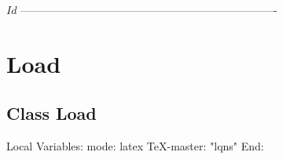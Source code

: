 \C 
\C $Id$
\C 
\C
\C ----------------------------------------------------------------------
\section{Load}
\label{sec:load}

\subsection{Class Load}
\C Local Variables: 
\C mode: latex
\C TeX-master: "lqns"
\C End: 
